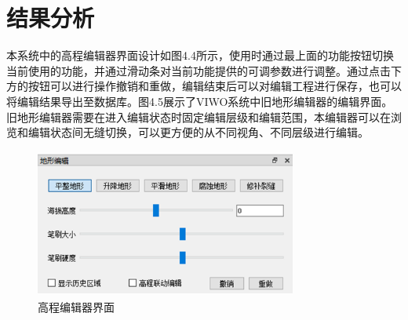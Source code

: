 \section{结果分析}
本系统中的高程编辑器界面设计如图4.4所示，使用时通过最上面的功能按钮切换当前使用的功能，并通过滑动条对当前功能提供的可调参数进行调整。通过点击下方的按钮可以进行操作撤销和重做，编辑结束后可以对编辑工程进行保存，也可以将编辑结果导出至数据库。图4.5展示了VIWO系统中旧地形编辑器的编辑界面。旧地形编辑器需要在进入编辑状态时固定编辑层级和编辑范围，本编辑器可以在浏览和编辑状态间无缝切换，可以更方便的从不同视角、不同层级进行编辑。
\begin{figure}[htbp]
    \centering
    \includegraphics[height=4.9cm,width=8.6cm]{figures/demInterface.png}
  \caption{高程编辑器界面}
  \end{figure}

